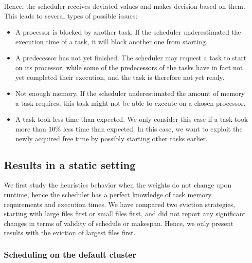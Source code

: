 \documentclass[conference]{IEEEtran}
\newcommand{\skug}[1]{{\color{blue}[SK: #1]}}
\begin{document}
    Hence, the scheduler receives deviated values and makes decision based on them.
    This leads to several types of possible issues:
    \begin{itemize}
        \item A processor is blocked by another task. If the scheduler underestimated the execution time of a task,
        it will block another one from starting.
        \item A predecessor has not yet finished.
        The scheduler may request a task to start on its processor, while
        some of the predecessors of the tasks have in fact not yet completed their execution, and the
        task is therefore not yet ready.
        \item Not enough memory. If the scheduler underestimated the amount of memory a task requires, this task might not be able to execute on a chosen processor.
        \item A task took less time than expected. We only consider this case if a task took more than 10\% less
        time than expected. In this
        case, we want to exploit the newly acquired free time by possibly starting other tasks earlier.
    \end{itemize}




\subsection{Results in a static setting} %
\label{sec.expe.static}

We first study the heuristics behavior when the weights do not change upon runtime,
hence the scheduler has a perfect knowledge of task memory requirements and execution times.
We have compared two eviction strategies, starting with large files first or small files first,
and did not report any significant changes in terms of validity of schedule or makespan.
Hence, we only present results with the eviction of largest files first.


    \subsubsection{Scheduling on the default cluster}
\end{document}
